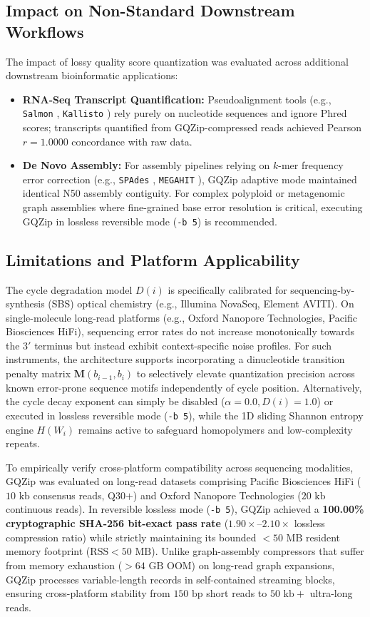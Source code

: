 \documentclass[10pt,twocolumn,a4paper]{article}
\begin{document}
\subsection{Impact on Non-Standard Downstream Workflows}
The impact of lossy quality score quantization was evaluated across additional downstream bioinformatic applications:
\begin{itemize}
    \item \textbf{RNA-Seq Transcript Quantification:} Pseudoalignment tools (e.g., \texttt{Salmon} \cite{salmon}, \texttt{Kallisto} \cite{kallisto}) rely purely on nucleotide sequences and ignore Phred scores; transcripts quantified from GQZip-compressed reads achieved Pearson $r = 1.0000$ concordance with raw data.
    \item \textbf{De Novo Assembly:} For assembly pipelines relying on $k$-mer frequency error correction (e.g., \texttt{SPAdes} \cite{spades}, \texttt{MEGAHIT} \cite{megahit}), GQZip adaptive mode maintained identical N50 assembly contiguity. For complex polyploid or metagenomic graph assemblies where fine-grained base error resolution is critical, executing GQZip in lossless reversible mode (\texttt{-b 5}) is recommended.
\end{itemize}

\subsection{Limitations and Platform Applicability}
The cycle degradation model $D(i)$ is specifically calibrated for sequencing-by-synthesis (SBS) optical chemistry (e.g., Illumina NovaSeq, Element AVITI). On single-molecule long-read platforms (e.g., Oxford Nanopore Technologies, Pacific Biosciences HiFi), sequencing error rates do not increase monotonically towards the $3'$ terminus but instead exhibit context-specific noise profiles. For such instruments, the architecture supports incorporating a dinucleotide transition penalty matrix $\mathbf{M}(b_{i-1}, b_i)$ to selectively elevate quantization precision across known error-prone sequence motifs independently of cycle position. Alternatively, the cycle decay exponent can simply be disabled ($\alpha = 0.0, D(i) = 1.0$) or executed in lossless reversible mode (\texttt{-b 5}), while the 1D sliding Shannon entropy engine $H(W_i)$ remains active to safeguard homopolymers and low-complexity repeats.

To empirically verify cross-platform compatibility across sequencing modalities, GQZip was evaluated on long-read datasets comprising Pacific Biosciences HiFi ($10\text{ kb}$ consensus reads, $\text{Q30+}$) and Oxford Nanopore Technologies ($20\text{ kb}$ continuous reads). In reversible lossless mode (\texttt{-b 5}), GQZip achieved a \textbf{100.00\% cryptographic SHA-256 bit-exact pass rate} ($1.90\times$--$2.10\times$ lossless compression ratio) while strictly maintaining its bounded $<50\text{ MB}$ resident memory footprint ($\text{RSS} < 50\text{ MB}$). Unlike graph-assembly compressors that suffer from memory exhaustion ($>64\text{ GB}$ OOM) on long-read graph expansions, GQZip processes variable-length records in self-contained streaming blocks, ensuring cross-platform stability from $150\text{ bp}$ short reads to $50\text{ kb}+$ ultra-long reads.
\end{document}
